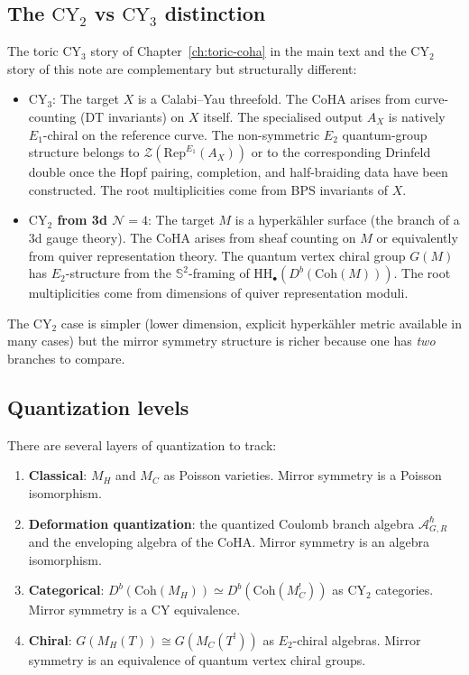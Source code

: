 \documentclass[11pt]{article}
\theoremstyle{definition}
\theoremstyle{remark}
\newcommand{\CY}{\mathrm{CY}}
\newcommand{\HH}{\mathrm{HH}}
\newcommand{\Rep}{\mathrm{Rep}}
\newcommand{\Coh}{\mathrm{Coh}}
\newcommand{\Eone}{E_1}
\newcommand{\Etwo}{E_2}
\newcommand{\cN}{\mathcal{N}}
\renewcommand{\hbar}{\hslash}
\begin{document}
\subsection{The $\CY_2$ vs $\CY_3$ distinction}

The toric $\CY_3$ story of Chapter~\ref*{ch:toric-coha} in the main text and the $\CY_2$ story of this note are complementary but structurally different:

\begin{itemize}
 \item \textbf{$\CY_3$}: The target $X$ is a Calabi--Yau threefold. The CoHA arises from curve-counting (DT invariants) on $X$ itself. The specialised output $A_X$ is natively $\Eone$-chiral on the reference curve. The non-symmetric $\Etwo$ quantum-group structure belongs to $\mathcal{Z}(\Rep^{\Eone}(A_X))$ or to the corresponding Drinfeld double once the Hopf pairing, completion, and half-braiding data have been constructed. The root multiplicities come from BPS invariants of $X$.

 \item \textbf{$\CY_2$ from 3d $\cN=4$}: The target $M$ is a hyperk\"ahler surface (the branch of a 3d gauge theory). The CoHA arises from sheaf counting on $M$ or equivalently from quiver representation theory. The quantum vertex chiral group $G(M)$ has $\Etwo$-structure from the $\mathbb{S}^2$-framing of $\HH_\bullet(D^b(\Coh(M)))$. The root multiplicities come from dimensions of quiver representation moduli.
\end{itemize}

The $\CY_2$ case is simpler (lower dimension, explicit hyperk\"ahler metric available in many cases) but the mirror symmetry structure is richer because one has \emph{two} branches to compare.

\subsection{Quantization levels}

There are several layers of quantization to track:

\begin{enumerate}[label=(\arabic*)]
 \item \textbf{Classical}: $M_H$ and $M_C$ as Poisson varieties. Mirror symmetry is a Poisson isomorphism.
 \item \textbf{Deformation quantization}: the quantized Coulomb branch algebra $\mathcal{A}^\hbar_{G,R}$ and the enveloping algebra of the CoHA. Mirror symmetry is an algebra isomorphism.
 \item \textbf{Categorical}: $D^b(\Coh(M_H)) \simeq D^b(\Coh(M_C^!))$ as $\CY_2$ categories. Mirror symmetry is a CY equivalence.
 \item \textbf{Chiral}: $G(M_H(T)) \cong G(M_C(T^!))$ as $\Etwo$-chiral algebras. Mirror symmetry is an equivalence of quantum vertex chiral groups.
\end{enumerate}
\end{document}
